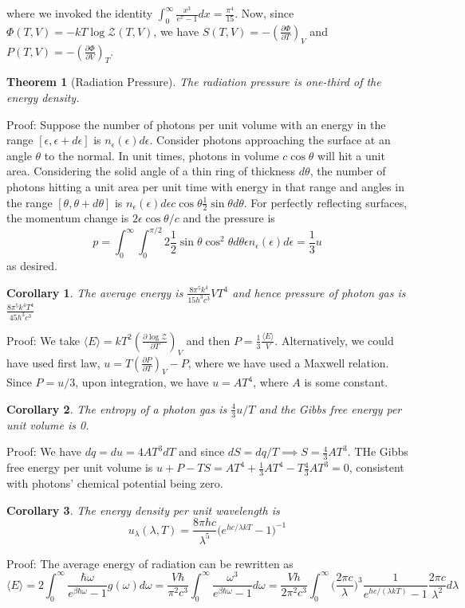 \documentclass[a4paper]{article}
\theoremstyle{new}
\newtheorem{thm}{Theorem}[section]
\newtheorem{cor}{Corollary}[section]
\begin{document}
where we invoked the identity $\int_0^\infty\frac{x^3}{e^x-1}dx=\frac{\pi^4}{15}$. Now, since $\Phi(T,V)=-kT\log\mathcal{Z}(T,V)$, we have $S(T,V)=-(\frac{\partial\Phi}{\partial T})_V$ and $P(T,V)=-(\frac{\partial\Phi}{\partial V})_T$.
\begin{thm}[Radiation Pressure]
The radiation pressure is one-third of the energy density.
\end{thm}
Proof: Suppose the number of photons per unit volume with an energy in the range $[\epsilon,\epsilon+d\epsilon]$ is $n_\epsilon(\epsilon)d\epsilon$. Consider photons approaching the surface at an angle $\theta$ to the normal. In unit times, photons in volume $c\cos\theta$ will hit a unit area. Considering the solid angle of a thin ring of thickness $d\theta$, the number of photons hitting a unit area per unit time with energy in that range and angles in the range $[\theta,\theta+d\theta]$ is $n_\epsilon(\epsilon)d\epsilon c\cos\theta\frac{1}{2}\sin\theta d\theta$. For perfectly reflecting surfaces, the momentum change is $2\epsilon\cos\theta/c$ and the pressure is
$$p=\int_0^\infty\int_0^{\pi/2}2\frac{1}{2}\sin\theta\cos^2\theta d\theta\epsilon n_\epsilon(\epsilon)d\epsilon=\frac{1}{3}u$$
as desired.
\begin{cor}
The average energy is $\frac{8\pi^5k^4}{15h^3c^3}VT^4$ and hence pressure of photon gas is $\frac{8\pi^5k^4T^4}{45h^3c^3}$
\end{cor}
Proof: We take
$\langle E\rangle=kT^2(\frac{\partial\log\mathcal{Z}}{\partial T})_V$ and then $P=\frac{1}{3}\frac{\langle E\rangle}{V}$. Alternatively, we could have used first law, $u=T(\frac{\partial P}{\partial T})_V-P$, where we have used a Maxwell relation. Since $P=u/3$, upon integration, we have $u=AT^4$, where $A$ is some constant. 
\begin{cor}
The entropy of a photon gas is $\frac{4}{3}u/T$ and the Gibbs free energy per unit volume is 0.
\end{cor}
Proof: We have $dq=du=4AT^3dT$ and since $dS=dq/T\implies S=\frac{4}{3}AT^3$. THe Gibbs free energy per unit volume is $u+P-TS=AT^4+\frac{1}{3}AT^4-T\frac{4}{3}AT^3=0$, consistent with photons' chemical potential being zero.
\begin{cor}
The energy density per unit wavelength is
$$u_\lambda(\lambda,T)=\frac{8\pi hc}{\lambda^5}\bigg(e^{hc/\lambda kT}-1\bigg)^{-1}$$
\end{cor}
Proof: The average energy of radiation can be rewritten as
$$\langle E\rangle=2\int_0^\infty\frac{\hbar\omega}{e^{\beta\hbar\omega}-1}g(\omega)d\omega=\frac{V\hbar}{\pi^2c^3}\int_0^\infty\frac{\omega^3}{e^{\beta\hbar\omega}-1}d\omega=\frac{Vh}{2\pi^2c^3}\int_0^\infty\bigg(\frac{2\pi c}{\lambda}\bigg)^3\frac{1}{e^{hc/(\lambda kT)}-1}\frac{2\pi c}{\lambda^2}d\lambda$$
\end{document}
